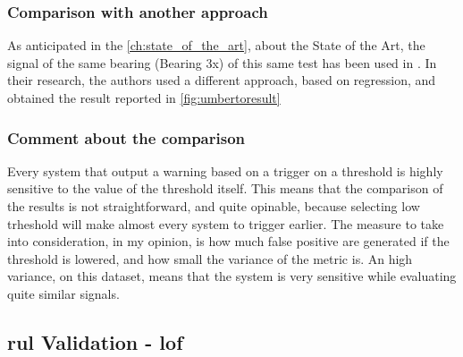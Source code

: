 \subsubsection{Comparison with another approach}
As anticipated in the \autoref{ch:state_of_the_art}, about the State of the Art, the signal of the same bearing (Bearing 3x) of this same test has been used in \cite{Umberto}. In their research, the authors used a different approach, based on regression, and obtained the result reported in \autoref{fig:umbertoresult}


\subsubsection{Comment about the comparison}
Every system that output a warning based on a trigger on a threshold is highly sensitive to the value of the threshold itself. This means that the comparison of the results is not straightforward, and quite opinable, because selecting low trheshold will make almost every system to trigger earlier. The measure to take into consideration, in my opinion, is how much false positive are generated if the threshold is lowered, and how small the variance of the metric is. An high variance, on this dataset, means that the system is very sensitive while evaluating quite similar signals.

\subsection{\gls{rul} Validation - \gls{lof}}